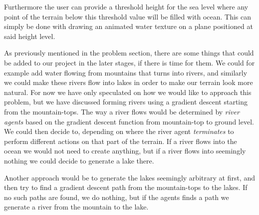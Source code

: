 Furthermore the user can provide a threshold height for the sea level where any point of the terrain below this threshold value will be filled with ocean. 
This can simply be done with drawing an animated water texture on a plane positioned at said height level. 

As previously mentioned in the problem section, there are some things that could be added to our project in the later stages, if there is time for them. 
We could for example add water flowing from mountains that turns into rivers, and similarly we could make these rivers flow into lakes in order to make our terrain look more natural.
For now we have only speculated on how we would like to approach this problem, but we have discussed forming rivers using a gradient descent starting from the mountain-tops.
The way a river flows would be determined by \textit{river agents} based on the gradient descent function from mountain-top to ground level. 
We could then decide to, depending on where the river agent \textit{terminates}  to perform different actions on that part of the terrain.
If a river flows into the ocean we would not need to create anything, but if a river flows into seemingly nothing we could decide to generate a lake there. 

Another approach would be to generate the lakes seemingly arbitrary at first, and then try to find a gradient descent path from the mountain-tops to the lakes.
If no such paths are found, we do nothing, but if the agents finds a path we generate a river from the mountain to the lake. 



